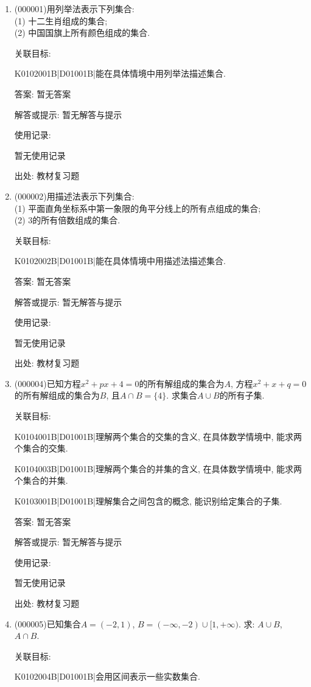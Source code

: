 \documentclass[10pt,a4paper]{article}
\begin{document}
\begin{enumerate}[1.]

\item { (000001)}用列举法表示下列集合:\\
(1) 十二生肖组成的集合;\\
(2) 中国国旗上所有颜色组成的集合.


关联目标:

K0102001B|D01001B|能在具体情境中用列举法描述集合.

答案: 暂无答案

解答或提示: 暂无解答与提示

使用记录:

暂无使用记录


出处: 教材复习题
\item { (000002)}用描述法表示下列集合:\\
(1) 平面直角坐标系中第一象限的角平分线上的所有点组成的集合;\\
(2) $3$的所有倍数组成的集合.


关联目标:

K0102002B|D01001B|能在具体情境中用描述法描述集合.

答案: 暂无答案

解答或提示: 暂无解答与提示

使用记录:

暂无使用记录


出处: 教材复习题
\item { (000004)}已知方程$x^2+px+4=0$的所有解组成的集合为$A$, 方程$x^2+x+q=0$的所有解组成的集合为$B$, 且$A\cap B=\{4\}$. 求集合$A\cup B$的所有子集.


关联目标:

K0104001B|D01001B|理解两个集合的交集的含义, 在具体数学情境中, 能求两个集合的交集.

K0104003B|D01001B|理解两个集合的并集的含义, 在具体数学情境中, 能求两个集合的并集.

K0103001B|D01001B|理解集合之间包含的概念, 能识别给定集合的子集.

答案: 暂无答案

解答或提示: 暂无解答与提示

使用记录:

暂无使用记录


出处: 教材复习题
\item { (000005)}已知集合$A=(-2, 1)$, $B=(-\infty, -2)\cup [1, +\infty)$. 求: $A\cup B$, $A\cap B$.


关联目标:

K0102004B|D01001B|会用区间表示一些实数集合.


\end{enumerate}
\end{document}
